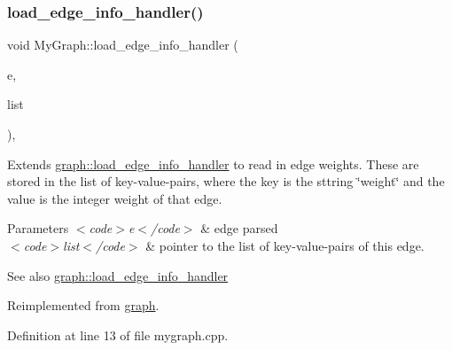 \mbox{\label{class_my_graph_aae6f9d1beab66851272f9064e2058064}} 
\subsubsection{\texorpdfstring{load\+\_\+edge\+\_\+info\+\_\+handler()}{load\_edge\_info\_handler()}}
{\footnotesize\ttfamily void My\+Graph\+::load\+\_\+edge\+\_\+info\+\_\+handler (\begin{DoxyParamCaption}\item[{\mbox{\hyperlink{classedge}{edge}}}]{e,  }\item[{\mbox{\hyperlink{struct_g_m_l__pair}{G\+M\+L\+\_\+pair}} $\ast$}]{list }\end{DoxyParamCaption})\hspace{0.3cm}{\ttfamily [virtual]}, {\ttfamily [inherited]}}

Extends \mbox{\hyperlink{classgraph_ad049a2f8c191a7dc359e684ef56304d1}{graph\+::load\+\_\+edge\+\_\+info\+\_\+handler}} to read in edge weights. These are stored in the list of key-\/value-\/pairs, where the key is the sttring \char`\"{}weight\char`\"{} and the value is the integer weight of that edge.


\begin{DoxyParams}{Parameters}
{\em $<$code$>$e$<$/code$>$} & edge parsed \\
\hline
{\em $<$code$>$list$<$/code$>$} & pointer to the list of key-\/value-\/pairs of this edge. \\
\hline
\end{DoxyParams}
\begin{DoxySeeAlso}{See also}
\mbox{\hyperlink{classgraph_ad049a2f8c191a7dc359e684ef56304d1}{graph\+::load\+\_\+edge\+\_\+info\+\_\+handler}} 
\end{DoxySeeAlso}


Reimplemented from \mbox{\hyperlink{classgraph_ad049a2f8c191a7dc359e684ef56304d1}{graph}}.



Definition at line 13 of file mygraph.\+cpp.


